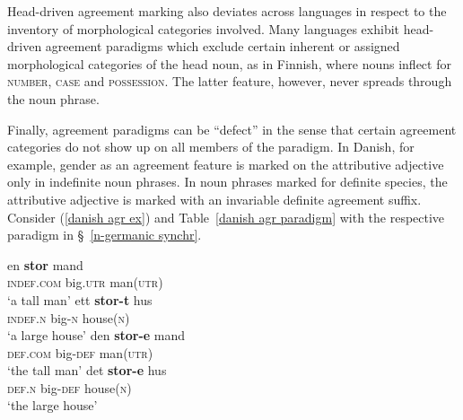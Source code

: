Head\hyp{}driven agreement marking also deviates across languages in respect to the inventory of morphological categories involved. Many languages exhibit head\hyp{}driven agreement paradigms which exclude certain inherent or assigned morphological categories of the head noun, as in Finnish, where nouns inflect for \textsc{number}, \textsc{case} and \textsc{possession}. The latter feature, however, never spreads through the noun phrase.
\begin{exe}
\ex
{}
\begin{xlist}
\end{xlist}
\end{exe}
Finally, agreement paradigms can be “defect” in the sense that certain agreement categories do not show up on all members of the paradigm. In Danish, for example, gender as an agreement feature is marked on the attributive adjective only in indefinite noun phrases. In noun phrases marked for definite species, the attributive adjective is marked with an invariable definite agreement suffix. Consider (\ref{danish agr ex}) and Table~\ref{danish agr paradigm} with the respective paradigm in \S~\ref{n-germanic synchr}.
\begin{exe}
\ex 
{} \label{danish agr ex}
\begin{xlist}
\ex
\gll en \textbf{stor} mand\\
	\textsc{indef.com} big.\textsc{utr} man(\textsc{utr})\\
\glt	‘a tall man’
\ex
\gll ett \textbf{stor-t} hus\\
	\textsc{indef.n} big-\textsc{n} house(\textsc{n})\\
\glt	‘a large house’
\ex	
\gll den \textbf{stor-e} mand\\
	\textsc{def.com} big-\textsc{def} man(\textsc{utr})\\
\glt	‘the tall man’
\ex
\gll det \textbf{stor-e} hus\\
	\textsc{def.n} big-\textsc{def} house(\textsc{n})\\
\glt	‘the large house’
\end{xlist}
\end{exe}
